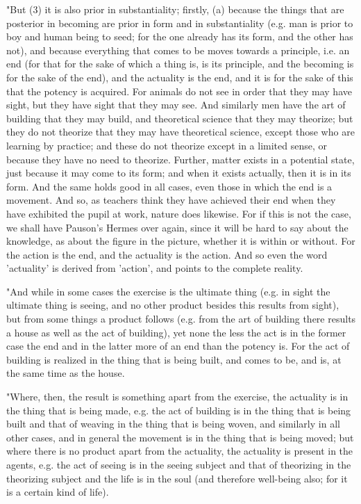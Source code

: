 "But (3) it is also prior in substantiality; firstly, (a) because
the things that are posterior in becoming are prior in form and in
substantiality (e.g. man is prior to boy and human being to seed;
for the one already has its form, and the other has not), and because
everything that comes to be moves towards a principle, i.e. an end
(for that for the sake of which a thing is, is its principle, and
the becoming is for the sake of the end), and the actuality is the
end, and it is for the sake of this that the potency is acquired.
For animals do not see in order that they may have sight, but they
have sight that they may see. And similarly men have the art of building
that they may build, and theoretical science that they may theorize;
but they do not theorize that they may have theoretical science, except
those who are learning by practice; and these do not theorize except
in a limited sense, or because they have no need to theorize. Further,
matter exists in a potential state, just because it may come to its
form; and when it exists actually, then it is in its form. And the
same holds good in all cases, even those in which the end is a movement.
And so, as teachers think they have achieved their end when they have
exhibited the pupil at work, nature does likewise. For if this is
not the case, we shall have Pauson's Hermes over again, since it will
be hard to say about the knowledge, as about the figure in the picture,
whether it is within or without. For the action is the end, and the
actuality is the action. And so even the word 'actuality' is derived
from 'action', and points to the complete reality. 

"And while in some cases the exercise is the ultimate thing (e.g.
in sight the ultimate thing is seeing, and no other product besides
this results from sight), but from some things a product follows (e.g.
from the art of building there results a house as well as the act
of building), yet none the less the act is in the former case the
end and in the latter more of an end than the potency is. For the
act of building is realized in the thing that is being built, and
comes to be, and is, at the same time as the house. 

"Where, then, the result is something apart from the exercise, the
actuality is in the thing that is being made, e.g. the act of building
is in the thing that is being built and that of weaving in the thing
that is being woven, and similarly in all other cases, and in general
the movement is in the thing that is being moved; but where there
is no product apart from the actuality, the actuality is present in
the agents, e.g. the act of seeing is in the seeing subject and that
of theorizing in the theorizing subject and the life is in the soul
(and therefore well-being also; for it is a certain kind of life).

